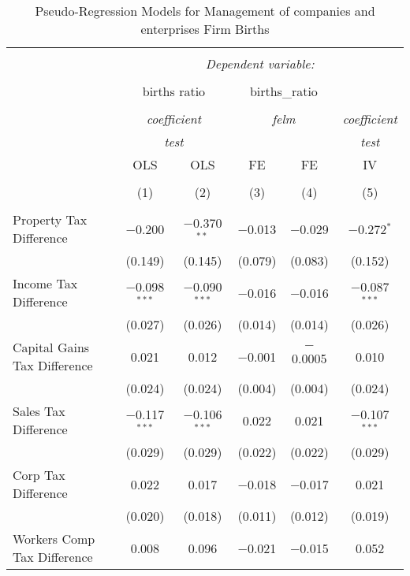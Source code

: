 
\begin{table}[!htbp] \centering 
  \caption{Pseudo-Regression Models for  Management of companies and enterprises Firm Births} 
  \label{} 
\begin{tabular}{@{\extracolsep{5pt}}lccccc} 
\\[-1.8ex]\hline 
\hline \\[-1.8ex] 
 & \multicolumn{5}{c}{\textit{Dependent variable:}} \\ 
\cline{2-6} 
\\[-1.8ex] & \multicolumn{2}{c}{births ratio} & \multicolumn{2}{c}{births\_ratio} &   \\ 
\\[-1.8ex] & \multicolumn{2}{c}{\textit{coefficient}} & \multicolumn{2}{c}{\textit{felm}} & \textit{coefficient} \\ 
 & \multicolumn{2}{c}{\textit{test}} & \multicolumn{2}{c}{\textit{}} & \textit{test} \\ 
 & OLS & OLS & FE & FE & IV \\ 
\\[-1.8ex] & (1) & (2) & (3) & (4) & (5)\\ 
\hline \\[-1.8ex] 
 Property Tax Difference & $-$0.200 & $-$0.370$^{**}$ & $-$0.013 & $-$0.029 & $-$0.272$^{*}$ \\ 
  & (0.149) & (0.145) & (0.079) & (0.083) & (0.152) \\ 
  Income Tax Difference & $-$0.098$^{***}$ & $-$0.090$^{***}$ & $-$0.016 & $-$0.016 & $-$0.087$^{***}$ \\ 
  & (0.027) & (0.026) & (0.014) & (0.014) & (0.026) \\ 
  Capital Gains Tax Difference & 0.021 & 0.012 & $-$0.001 & $-$0.0005 & 0.010 \\ 
  & (0.024) & (0.024) & (0.004) & (0.004) & (0.024) \\ 
  Sales Tax Difference & $-$0.117$^{***}$ & $-$0.106$^{***}$ & 0.022 & 0.021 & $-$0.107$^{***}$ \\ 
  & (0.029) & (0.029) & (0.022) & (0.022) & (0.029) \\ 
  Corp Tax Difference & 0.022 & 0.017 & $-$0.018 & $-$0.017 & 0.021 \\ 
  & (0.020) & (0.018) & (0.011) & (0.012) & (0.019) \\ 
  Workers Comp Tax Difference & 0.008 & 0.096 & $-$0.021 & $-$0.015 & 0.052 \\ 

\end{tabular}
\end{table}
